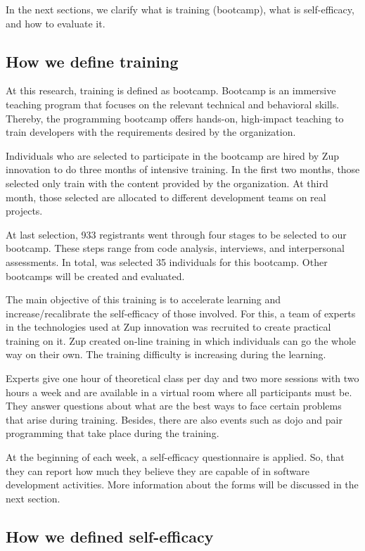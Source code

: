 \documentclass[10pt, conference]{IEEEtran}
\begin{document}
In the next sections, we clarify what is training (bootcamp), what is self-efficacy, and how to evaluate it. 


\subsection{How we define training}
At this research, training is defined as bootcamp. Bootcamp is an immersive teaching program that focuses on the relevant technical and behavioral skills. Thereby, the programming bootcamp offers hands-on, high-impact teaching to train developers with the requirements desired by the organization.

Individuals who are selected to participate in the bootcamp are hired by Zup innovation to do three months of intensive training. In the first two months, those selected only train with the content provided by the organization. At third month, those selected are allocated to different development teams on real projects.

At last selection, 933 registrants went through four stages to be selected to our bootcamp. These steps range from code analysis, interviews, and interpersonal assessments. In total, was selected 35 individuals for this bootcamp. Other bootcamps will be created and evaluated. 

The main objective of this training is to accelerate learning and increase/recalibrate the self-efficacy of those involved. For this, a team of experts in the technologies used at Zup innovation was recruited to create practical training on it. Zup created on-line training in which individuals can go the whole way on their own. The training difficulty is increasing during the learning. 

Experts give one hour of theoretical class per day and two more sessions with two hours a week and are available in a virtual room where all participants must be. They answer questions about what are the best ways to face certain problems that arise during training. Besides, there are also events such as dojo and pair programming that take place during the training.

At the beginning of each week, a self-efficacy questionnaire is applied. So, that they can report how much they believe they are capable of in software development activities. More information about the forms will be discussed in the next section.

\subsection{How we defined self-efficacy }
\end{document}
